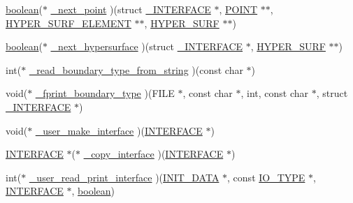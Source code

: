 \begin{DoxyCompactItemize}
\item 
\hyperlink{cdecs_8h_ad048433382a936258fb49e2ec4f148e1}{boolean}($\ast$ \hyperlink{struct___i___u_s_e_r___i_n_t_e_r_f_a_c_e_a14a862cd33818e91e97215d67c4fbfd2}{\+\_\+next\+\_\+point} )(struct \hyperlink{int_8h_d0/d95/struct___i_n_t_e_r_f_a_c_e}{\+\_\+\+I\+N\+T\+E\+R\+F\+A\+CE} $\ast$, \hyperlink{int_8h_a3a87c5c9d0146e30a4bf720f701e5a63}{P\+O\+I\+NT} $\ast$$\ast$, \hyperlink{int_8h_a17e21ae7174174d7a55516f8c9a8f12f}{H\+Y\+P\+E\+R\+\_\+\+S\+U\+R\+F\+\_\+\+E\+L\+E\+M\+E\+NT} $\ast$$\ast$, \hyperlink{int_8h_acef50fa4757ce0d3f75c97fab5a175bc}{H\+Y\+P\+E\+R\+\_\+\+S\+U\+RF} $\ast$$\ast$)
\item 
\hyperlink{cdecs_8h_ad048433382a936258fb49e2ec4f148e1}{boolean}($\ast$ \hyperlink{struct___i___u_s_e_r___i_n_t_e_r_f_a_c_e_a56cbd417f254ec2f23ee5edf2046e058}{\+\_\+next\+\_\+hypersurface} )(struct \hyperlink{int_8h_d0/d95/struct___i_n_t_e_r_f_a_c_e}{\+\_\+\+I\+N\+T\+E\+R\+F\+A\+CE} $\ast$, \hyperlink{int_8h_acef50fa4757ce0d3f75c97fab5a175bc}{H\+Y\+P\+E\+R\+\_\+\+S\+U\+RF} $\ast$$\ast$)
\item 
int($\ast$ \hyperlink{struct___i___u_s_e_r___i_n_t_e_r_f_a_c_e_a9f751a5eb0f9d82513525bd308ab310d}{\+\_\+read\+\_\+boundary\+\_\+type\+\_\+from\+\_\+string} )(const char $\ast$)
\item 
void($\ast$ \hyperlink{struct___i___u_s_e_r___i_n_t_e_r_f_a_c_e_a59d236065f76822d1d7627705182bc42}{\+\_\+fprint\+\_\+boundary\+\_\+type} )(F\+I\+LE $\ast$, const char $\ast$, int, const char $\ast$, struct \hyperlink{int_8h_d0/d95/struct___i_n_t_e_r_f_a_c_e}{\+\_\+\+I\+N\+T\+E\+R\+F\+A\+CE} $\ast$)
\item 
void($\ast$ \hyperlink{struct___i___u_s_e_r___i_n_t_e_r_f_a_c_e_aba18f009c8ad4f879189b4198be7bfa9}{\+\_\+user\+\_\+make\+\_\+interface} )(\hyperlink{int_8h_a58cf562d0d320a608294b7310ea167dc}{I\+N\+T\+E\+R\+F\+A\+CE} $\ast$)
\item 
\hyperlink{int_8h_a58cf562d0d320a608294b7310ea167dc}{I\+N\+T\+E\+R\+F\+A\+CE} $\ast$($\ast$ \hyperlink{struct___i___u_s_e_r___i_n_t_e_r_f_a_c_e_a10d3fc7e2ba127e9e2efeb9ca18b2cb5}{\+\_\+copy\+\_\+interface} )(\hyperlink{int_8h_a58cf562d0d320a608294b7310ea167dc}{I\+N\+T\+E\+R\+F\+A\+CE} $\ast$)
\item 
int($\ast$ \hyperlink{struct___i___u_s_e_r___i_n_t_e_r_f_a_c_e_a64b119dbd2d4641c8ef9db0a013c78fe}{\+\_\+user\+\_\+read\+\_\+print\+\_\+interface} )(\hyperlink{cdecs_8h_a18423d263765f9b6e78d8f1089446c91}{I\+N\+I\+T\+\_\+\+D\+A\+TA} $\ast$, const \hyperlink{cdecs_8h_ab53ca65803ae78b17636e622a6f2a062}{I\+O\+\_\+\+T\+Y\+PE} $\ast$, \hyperlink{int_8h_a58cf562d0d320a608294b7310ea167dc}{I\+N\+T\+E\+R\+F\+A\+CE} $\ast$, \hyperlink{cdecs_8h_ad048433382a936258fb49e2ec4f148e1}{boolean})

\end{DoxyCompactItemize}
